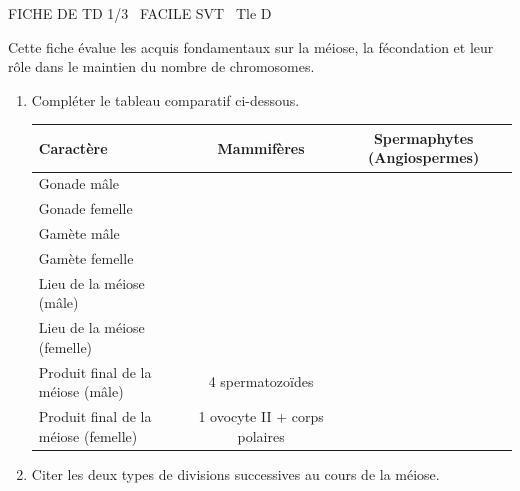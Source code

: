 \documentclass[11pt]{article}
\begin{document}
\begin{tcolorbox}[enhanced,colback=popink,colframe=popink,arc=10pt,boxrule=0pt,left=12pt,right=12pt,top=9pt,bottom=9pt]
{\color{white}\popxbold\small FICHE DE TD 1/3 \textbullet\ FACILE \hfill SVT \textbullet\ Tle D\par}
\end{tcolorbox}
\vspace{4pt}
Cette fiche évalue les acquis fondamentaux sur la méiose, la fécondation et leur rôle dans le maintien du nombre de chromosomes.

\begin{exercice}
\begin{enumerate}
    \item Compléter le tableau comparatif ci-dessous.
    \begin{tabularx}{\linewidth}{|X|c|c|}
    \hline
    \textbf{Caractère} & \textbf{Mammifères} & \textbf{Spermaphytes (Angiospermes)} \\
    \hline
    Gonade mâle & & \\
    \hline
    Gonade femelle & & \\
    \hline
    Gamète mâle & & \\
    \hline
    Gamète femelle & & \\
    \hline
    Lieu de la méiose (mâle) & & \\
    \hline
    Lieu de la méiose (femelle) & & \\
    \hline
    Produit final de la méiose (mâle) & 4 spermatozoïdes & \\
    \hline
    Produit final de la méiose (femelle) & 1 ovocyte II + corps polaires & \\
    \hline
    \end{tabularx}
    \item Citer les deux types de divisions successives au cours de la méiose.
\end{enumerate}
\end{exercice}
\end{document}
